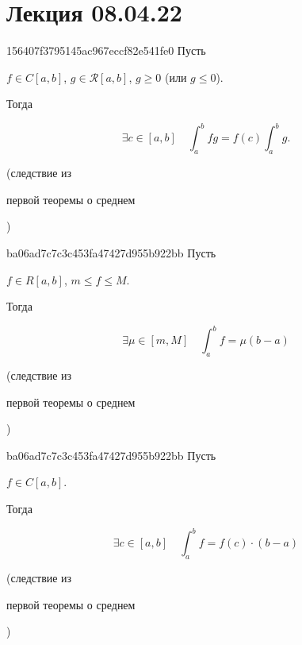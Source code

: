 \section{Лекция 08.04.22}
\begin{note}{156407f3795145ac967eccf82e541fe0}
    Пусть \begin{icloze}{2}\({ f \in C[a, b] }\), \({ g \in \mathcal R[a, b] }\), \({ g \geqslant 0 }\) (или \({ g \leqslant 0 }\)).\end{icloze}
    Тогда
    \begin{icloze}{1}
        \[
            \exists c \in [a, b] \quad \int_{a}^{b} fg = f(c) \int_{a}^{b} g.
        \]
    \end{icloze}

    \begin{center}
        \tiny
        (следствие из \begin{icloze}{3}первой теоремы о среднем\end{icloze})
    \end{center}
\end{note}

\begin{note}{ba06ad7c7c3c453fa47427d955b922bb}
    Пусть \begin{icloze}{2}\({ f \in R[a, b] }\), \({ m \leqslant f \leqslant M }\).\end{icloze}
    Тогда
    \begin{icloze}{1}
        \[
            \exists \mu \in [m, M] \quad \int_{a}^{b} f = \mu(b - a)
        \]
    \end{icloze}

    \begin{center}
        \tiny
        (следствие из \begin{icloze}{3}первой теоремы о среднем\end{icloze})
    \end{center}
\end{note}

\begin{note}{ba06ad7c7c3c453fa47427d955b922bb}
    Пусть \begin{icloze}{2}\({ f \in C[a, b] }\).\end{icloze}
    Тогда
    \begin{icloze}{1}
        \[
            \exists c \in [a, b] \quad \int_{a}^{b} f = f(c) \cdot (b - a)
        \]
    \end{icloze}

    \begin{center}
        \tiny
        (следствие из \begin{icloze}{3}первой теоремы о среднем\end{icloze})
    \end{center}
\end{note}

